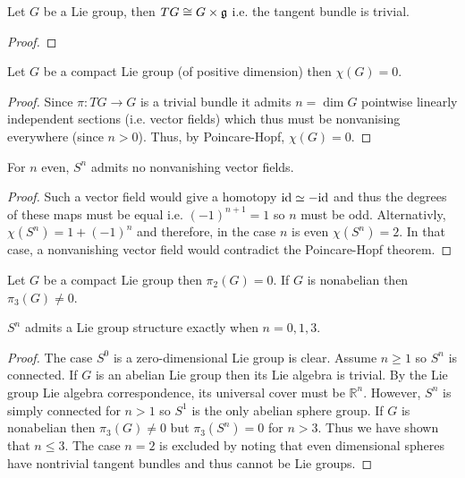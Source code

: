\documentclass[12pt]{article}
\newcommand{\R}{\mathbb{R}}
\begin{document}
\begin{theorem}
Let $G$ be a Lie group, then $TG \cong G \times \mathfrak{g}$ i.e. the tangent bundle is trivial.
\end{theorem}

\begin{proof}

\end{proof}

\begin{theorem}
Let $G$ be a compact Lie group (of positive dimension) then $\chi(G) = 0$.
\end{theorem}

\begin{proof}
Since $\pi : T G \to G$ is a trivial bundle it admits $n = \dim{G}$ pointwise linearly independent sections (i.e. vector fields) which thus must be nonvanising everywhere (since $n > 0$). Thus, by Poincare-Hopf, $\chi(G) = 0$.
\end{proof}

\begin{theorem}
For $n$ even, $S^n$ admits no nonvanishing vector fields.
\end{theorem}

\begin{proof}
Such a vector field would give a homotopy $\mathrm{id} \simeq - \mathrm{id}$ and thus the degrees of these maps must be equal i.e. $(-1)^{n+1} = 1$ so $n$ must be odd. Alternativly, $\chi(S^n) = 1 + (-1)^n$ and therefore, in the case $n$ is even $\chi(S^n) = 2$. In that case, a nonvanishing vector field would contradict the Poincare-Hopf theorem.
\end{proof}

\begin{theorem}
Let $G$ be a compact Lie group then $\pi_2(G) = 0$. If $G$ is nonabelian then $\pi_3(G) \neq 0$.
\end{theorem}

\begin{corollary}
$S^n$ admits a Lie group structure exactly when $n = 0,1,3$. 
\end{corollary}

\begin{proof}
The case $S^0$ is a zero-dimensional Lie group is clear. Assume $n \ge 1$ so $S^n$ is connected.
If $G$ is an abelian Lie group then its Lie algebra is trivial. By the Lie group Lie algebra correspondence, its universal cover must be $\R^n$. However, $S^n$ is simply connected for $n > 1$ so $S^1$ is the only abelian sphere group. If $G$ is nonabelian then $\pi_3(G) \neq 0$  but $\pi_3(S^n) = 0$ for $n > 3$. Thus we have shown that $n \le 3$. The case $n = 2$ is excluded by noting that even dimensional spheres have nontrivial tangent bundles and thus cannot be Lie groups. 
\end{proof}
\end{document}
